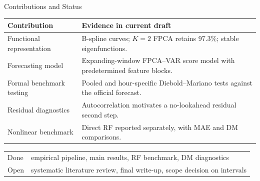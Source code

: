 \documentclass[10pt,aspectratio=169]{beamer}
\begin{document}
\begin{frame}{Contributions and Status}
  \small
  \begin{tabular}{p{}p{}}
    \toprule
    Contribution & Evidence in current draft \\
    \midrule
    Functional representation &
    B-spline curves; $K=2$ FPCA retains 97.3\%; stable eigenfunctions. \\
    Forecasting model &
    Expanding-window FPCA--VAR score model with predetermined feature blocks. \\
    Formal benchmark testing &
    Pooled and hour-specific Diebold--Mariano tests against the official forecast. \\
    Residual diagnostics &
    Autocorrelation motivates a no-lookahead residual second step. \\
    Nonlinear benchmark &
    Direct RF reported separately, with MAE and DM comparisons. \\
    \bottomrule
  \end{tabular}

  \vspace{0.8em}
  \begin{tabular}{@{}ll@{}}
    Done & empirical pipeline, main results, RF benchmark, DM diagnostics \\
    Open & systematic literature review, final write-up, scope decision on intervals \\
  \end{tabular}
\end{frame}
\end{document}
